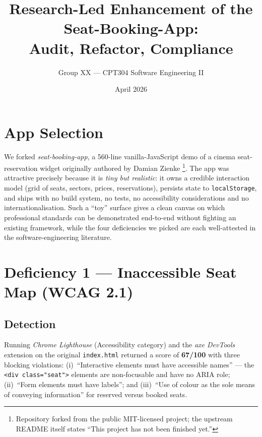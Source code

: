 \documentclass[a4paper,11pt]{article}
\title{\fontsize{16pt}{20pt}\selectfont\bfseries Research-Led Enhancement of the Seat-Booking-App:\\Audit, Refactor, Compliance}
\author{Group XX --- CPT304 Software Engineering II}
\date{April 2026}
\begin{document}
\maketitle
\thispagestyle{empty}

\section{App Selection}

We forked \textit{seat-booking-app}, a 560-line vanilla-JavaScript demo of a
cinema seat-reservation widget originally authored by Damian Zienke
\cite{wcag21}\footnote{Repository forked from the public MIT-licensed
project; the upstream README itself states ``This project has not been
finished yet.''}.  The app was attractive precisely because it is
\emph{tiny but realistic}: it owns a credible interaction model
(grid of seats, sectors, prices, reservations), persists state to
\texttt{localStorage}, and ships with no build system, no tests, no
accessibility considerations and no internationalisation.  Such a
``toy'' surface gives a clean canvas on which professional standards
can be demonstrated end-to-end without fighting an existing
framework, while the four deficiencies we picked are each
well-attested in the software-engineering literature.

\section{Deficiency 1 --- Inaccessible Seat Map (WCAG 2.1)}
\subsection{Detection}
Running \textit{Chrome Lighthouse} (Accessibility category) and the
\textit{axe DevTools} extension on the original \texttt{index.html}
returned a score of \textbf{67/100} with three blocking violations:
(i)~``Interactive elements must have accessible names'' --- the
\texttt{<div class="seat">} elements are non-focusable and have no
ARIA role; (ii)~``Form elements must have labels''; and (iii)~``Use
of colour as the sole means of conveying information'' for
reserved versus booked seats.
\end{document}
